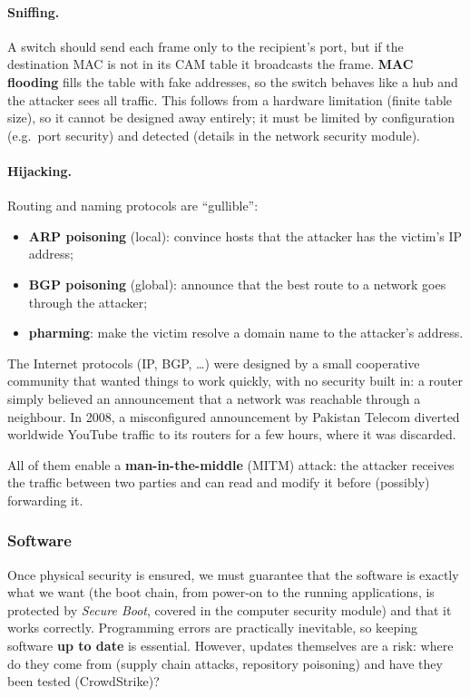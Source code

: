 \paragraph{Sniffing.} A switch should send each frame only to the recipient's port, but if the destination MAC is not in its CAM table it broadcasts the frame. \textbf{MAC flooding} fills the table with fake addresses, so the switch behaves like a hub and the attacker sees all traffic. This follows from a hardware limitation (finite table size), so it cannot be designed away entirely; it must be limited by configuration (e.g.\ port security) and detected (details in the network security module).

\paragraph{Hijacking.} Routing and naming protocols are \enquote{gullible}:
\begin{itemize}
    \item \textbf{ARP poisoning} (local): convince hosts that the attacker has the victim's IP address;
    \item \textbf{BGP poisoning} (global): announce that the best route to a network goes through the attacker;
    \item \textbf{pharming}: make the victim resolve a domain name to the attacker's address.
\end{itemize}
The Internet protocols (IP, BGP, \dots) were designed by a small cooperative community that wanted things to work quickly, with no security built in: a router simply believed an announcement that a network was reachable through a neighbour. In 2008, a misconfigured announcement by Pakistan Telecom diverted worldwide YouTube traffic to its routers for a few hours, where it was discarded.

All of them enable a \textbf{man-in-the-middle} (MITM) attack: the attacker receives the traffic between two parties and can read and modify it before (possibly) forwarding it.

\subsubsection{Software}
Once physical security is ensured, we must guarantee that the software is exactly what we want (the boot chain, from power-on to the running applications, is protected by \emph{Secure Boot}, covered in the computer security module) and that it works correctly. Programming errors are practically inevitable, so keeping software \textbf{up to date} is essential. However, updates themselves are a risk: where do they come from (supply chain attacks, repository poisoning) and have they been tested (CrowdStrike)?

